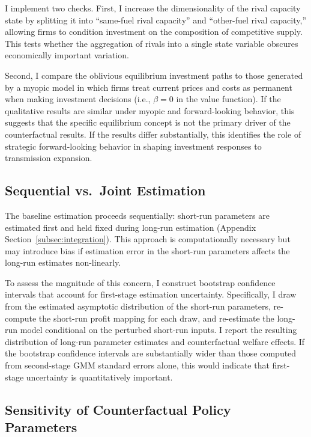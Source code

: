 \documentclass[12pt]{article}
\begin{document}
I implement two checks. First, I increase the dimensionality of the rival capacity state by splitting it into ``same-fuel rival capacity'' and ``other-fuel rival capacity,'' allowing firms to condition investment on the composition of competitive supply. This tests whether the aggregation of rivals into a single state variable obscures economically important variation.

Second, I compare the oblivious equilibrium investment paths to those generated by a myopic model in which firms treat current prices and costs as permanent when making investment decisions (i.e., $\beta = 0$ in the value function). If the qualitative results are similar under myopic and forward-looking behavior, this suggests that the specific equilibrium concept is not the primary driver of the counterfactual results. If the results differ substantially, this identifies the role of strategic forward-looking behavior in shaping investment responses to transmission expansion.


\subsection{Sequential vs.\ Joint Estimation}\label{app:robustness:sequential}

The baseline estimation proceeds sequentially: short-run parameters are estimated first and held fixed during long-run estimation (Appendix Section~\ref{subsec:integration}). This approach is computationally necessary but may introduce bias if estimation error in the short-run parameters affects the long-run estimates non-linearly.

To assess the magnitude of this concern, I construct bootstrap confidence intervals that account for first-stage estimation uncertainty. Specifically, I draw from the estimated asymptotic distribution of the short-run parameters, re-compute the short-run profit mapping for each draw, and re-estimate the long-run model conditional on the perturbed short-run inputs. I report the resulting distribution of long-run parameter estimates and counterfactual welfare effects. If the bootstrap confidence intervals are substantially wider than those computed from second-stage GMM standard errors alone, this would indicate that first-stage uncertainty is quantitatively important.


\subsection{Sensitivity of Counterfactual Policy Parameters}\label{app:robustness:policy}
\end{document}
